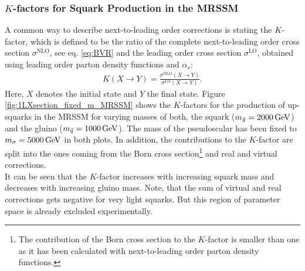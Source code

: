 \subsubsection{$K$-factors for Squark Production in the MRSSM}
A common way to describe next-to-leading order corrections is stating the $K$-factor, which is defined to be the ratio of the complete next-to-leading order cross section $\sigma^{\mathrm{NLO}}$, see eq. \eqref{eq:BVR} and the leading order cross section $\sigma^{\mathrm{LO}}$, obtained using leading order parton density functions and $\alpha_s$:
\begin{align}
K(X \to Y) = \frac{\sigma^{\mathrm{NLO}}(X \to Y)}{\sigma^{\mathrm{LO}}(X \to Y)}.
\end{align}
Here, $X$ denotes the initial state and $Y$ the final state.
Figure \ref{fig:1LXsection_fixed_m_MRSSM} shows the $K$-factors for the production of up-squarks in the MRSSM for varying masses of both, the squark \mbox{($m_{\tilde{g}} = \unit[2000]{GeV}$)} and the gluino ($m_{\tilde{q}} = \unit[1000]{GeV}$). The mass of the pseudoscalar has been fixed to $m_{\sigma} = \unit[5000]{GeV}$ in both plots.
In addition, the contributions to the $K$-factor are split into the ones coming from the Born cross section\footnote{The contribution of the Born cross section to the $K$-factor is smaller than one as it has been calculated with next-to-leading order parton density functions.} and real and virtual corrections.\\
It can be seen that the  $K$-factor increases with increasing squark mass and decreases with increasing gluino mass. Note, that the sum of virtual and real corrections gets negative for very light squarks. But this region of parameter space is already excluded experimentally.
